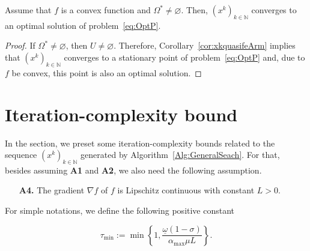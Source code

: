 \begin{theorem}
	Assume that $f$ is a convex function and  $\Omega^* \neq \varnothing$. Then,   $(x^k)_{k\in\mathbb{N}}$ converges to an optimal solution of problem~\eqref{eq:OptP}.
\end{theorem}
\begin{proof}
	If $\Omega^* \neq \varnothing$, then   $U \neq \varnothing$.   Therefore,  Corollary~\ref{cor:xkquasifeArm} implies  that $(x^k)_{k\in\mathbb{N}}$ converges to a stationary point of  problem~\eqref{eq:OptP} and,  due to  $f$ be   convex, this point  is also an optimal solution.
\end{proof}


\section{Iteration-complexity bound}\label{SubSec:IterCompArm}

In the section, we preset some  iteration-complexity bounds related to  the sequence $(x^k)_{k\in\mathbb{N}}$ generated by  Algorithm~\ref{Alg:GeneralSeach}.  For that, besides  assuming  {\bf A1} and {\bf A2},  we also need the following assumption.
\begin{itemize}
	\item[{\bf A4.}] The  gradient $\nabla f$ of $f$ is  Lipschitz continuous with constant $L>0$.
\end{itemize}
For simple notations, we define the  following positive constant



\begin{equation} \label{eq;taumin}
	\tau_{\min} := \min \left\{1, \frac{\underline\omega(1-\sigma)}{{\alpha_{\max}}\mu L}\right\}.
\end{equation}



